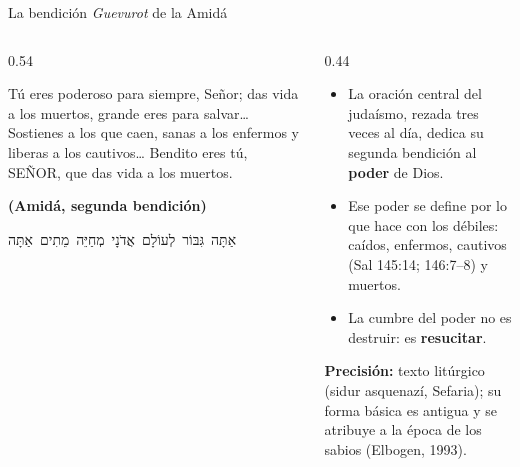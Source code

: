 \documentclass[hyperref={bookmarks=false},aspectratio=169]{beamer}
\newcommand{\heb}[1]{\mbox{\foreignlanguage{hebrew}{#1}}}
\newcommand{\SENOR}{S{\fontsize{0.78em}{1em}\selectfont EÑOR}}
\newcommand{\fuente}[1]{\par\hfill{\upshape\bfseries\footnotesize\textcolor{azul}{#1}}}
\newcommand{\destacar}[1]{\textbf{\textcolor{azul}{#1}}}
\newcommand{\precision}[1]{{\footnotesize\color{gris}\textbf{Precisión:} #1}}
\begin{document}
\begin{frame}{La bendición \emph{Guevurot} de la Amidá}
\begin{columns}[t,onlytextwidth]
\begin{column}{0.54\textwidth}
\begin{cita}[colback=dorado!10!papiro,colframe=dorado!80!azul]Tú eres poderoso para siempre, Señor; das vida a los muertos, grande eres para salvar\ldots{} Sostienes a los que caen, sanas a los enfermos y liberas a los cautivos\ldots{} Bendito eres tú, \SENOR, que das vida a los muertos.\fuente{(Amidá, segunda bendición)}\end{cita}
\begin{center}\scriptsize\heb{אַתָּה גִּבּוֹר לְעוֹלָם אֲדֹנָי מְחַיֵּה מֵתִים אַתָּה}\end{center}
\end{column}
\begin{column}{0.44\textwidth}\small
\begin{itemize}
\item La oración central del judaísmo, rezada tres veces al día, dedica su segunda bendición al \destacar{poder} de Dios.
\item Ese poder se define por lo que hace con los débiles: caídos, enfermos, cautivos (Sal 145:14; 146:7--8) y muertos.
\item La cumbre del poder no es destruir: es \destacar{resucitar}.
\end{itemize}
\precision{texto litúrgico (sidur asquenazí, Sefaria); su forma básica es antigua y se atribuye a la época de los sabios (Elbogen, 1993).}
\end{column}
\end{columns}
\end{frame}
\end{document}
